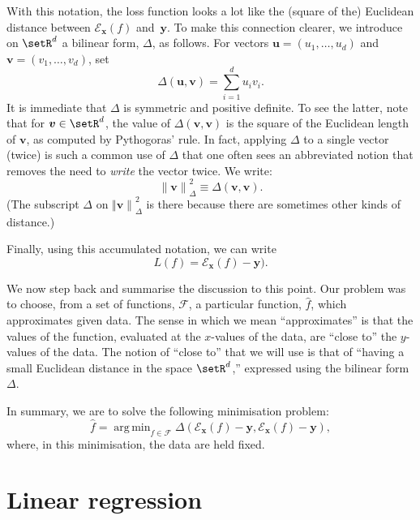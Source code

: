 \documentclass[10pt, a4paper]{article}
\DeclareMathOperator*{\argmin}{arg\,min}
\begin{document}
With this notation, the loss function looks a lot like the (square of
the) Euclidean distance between $\mathcal{E}_{\bm{x}}(f)$
and~$\bm{y}$. To make this connection clearer, we introduce on
$\setR^d$ a bilinear form, $\Delta$, as follows. For vectors
$\bm{u} = (u_1,\dotsc,u_d)$ and $\bm{v}=(v_1,\dotsc,v_d)$, set
\[
  \Delta(\bm{u}, \bm{v}) = \sum_{i=1}^d u_iv_i.
\]
It is immediate that $\Delta$ is symmetric and positive definite. To see
the latter, note that for $\bm{v}\in\setR^d$, the value of
$\Delta(\bm{v}, \bm{v})$ is the square of the Euclidean length of
$\bm{v}$, as computed by Pythogoras' rule. In fact, applying $\Delta$ to a
single vector (twice) is such a common use of $\Delta$ that one often sees
an abbreviated notion that removes the need to \emph{write} the vector
twice. We write:
\[
  {\lVert \bm{v} \rVert}_\Delta^2 \equiv \Delta(\bm{v}, \bm{v}).
\]
(The subscript $\Delta$ on ${\Vert\bm{v}\rVert}_\Delta^2$ is there because there are
sometimes other kinds of distance.)

Finally, using this accumulated notation, we can write
\begin{equation}
  L(f) = \mathcal{E}_{\bm{x}}(f) - \bm{y}).
\end{equation}

We now step back and summarise the discussion to this point. Our
problem was to choose, from a set of functions, $\mathcal{F}$, a particular
function, $\hat{f}$, which approximates given data. The sense in which
we mean “approximates” is that the values of the function, evaluated
at the $x$-values of the data, are “close to” the $y$-values of the
data. The notion of “close to” that we will use is that of “having a
small Euclidean distance in the space $\setR^d$,” expressed using the
bilinear form~$\Delta$.

In summary, we are to solve the following minimisation problem: 
\begin{equation}
  \label{eq:least-squares}
  \hat{f} = \argmin_{f\in\mathcal{F}} \Delta(\mathcal{E}_{\bm{x}}(f) - \bm{y}, \mathcal{E}_{\bm{x}}(f) - \bm{y}),
\end{equation}
where, in this minimisation, the data are held fixed.

\section{Linear regression}
\end{document}
